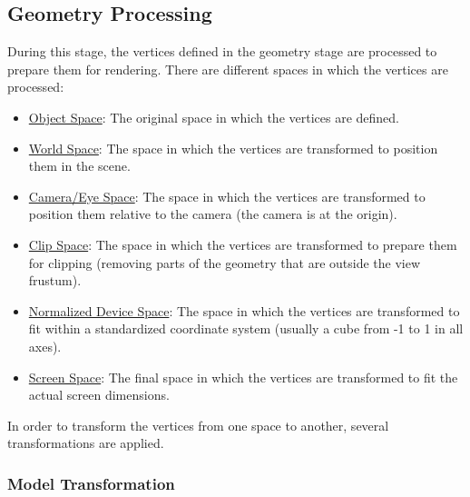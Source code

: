 \subsection{Geometry Processing}

During this stage, the vertices defined in the geometry stage are processed to prepare them for rendering. There are different spaces in which the vertices are processed:
\begin{itemize}
    \item \ul{Object Space}: The original space in which the vertices are defined.
    \item \ul{World Space}: The space in which the vertices are transformed to position them in the scene.
    \item \ul{Camera/Eye Space}: The space in which the vertices are transformed to position them relative to the camera (the camera is at the origin).
    \item \ul{Clip Space}: The space in which the vertices are transformed to prepare them for clipping (removing parts of the geometry that are outside the view frustum).
    \item \ul{Normalized Device Space}: The space in which the vertices are transformed to fit within a standardized coordinate system (usually a cube from -1 to 1 in all axes).
    \item \ul{Screen Space}: The final space in which the vertices are transformed to fit the actual screen dimensions.
\end{itemize}

In order to transform the vertices from one space to another, several transformations are applied.

\subsubsection{Model Transformation}

